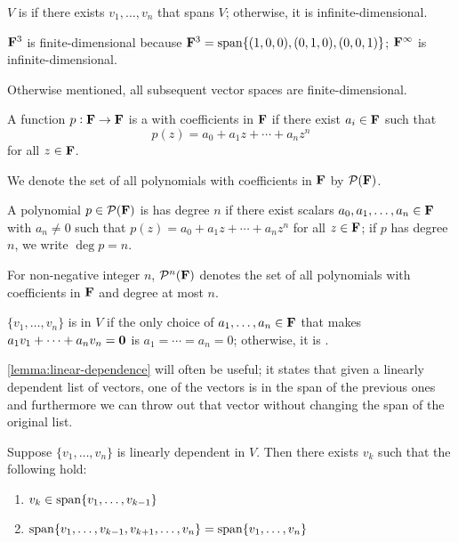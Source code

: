\begin{definition}
$V$ is  if there exists $v_1,\dots,v_n$ that spans $V$; otherwise, it is infinite-dimensional.
\end{definition}

\begin{example}
$\mathbf F^3$ is finite-dimensional because $\mathbf F^3=\operatorname{span}\{(1,0,0),(0,1,0),(0,0,1)\}$; $\mathbf F^\infty$ is infinite-dimensional.
\end{example}

Otherwise mentioned, all subsequent vector spaces are finite-dimensional. 

\begin{definition}[Polynomial]
A function $p:\mathbf F\to\mathbf F$ is a  with coefficients in $\mathbf F$ if there exist $a_i\in\mathbf F$ such that
\[p(z)=a_0+a_1z+\cdots+a_nz^n\]
for all $z\in\mathbf F$.

We denote the set of all polynomials with coefficients in $\mathbf F$ by $\mathcal{P}(\mathbf F)$.

A polynomial $p\in\mathcal{P}(\mathbf F)$ is has degree $n$ if there exist scalars $a_0,a_1,\dots,a_n\in\mathbf F$ with $a_n\neq0$ such that $p(z)=a_0+a_1z+\cdots+a_nz^n$ for all $z\in\mathbf F$; if $p$ has degree $n$, we write $\deg p=n$.

For non-negative integer $n$, $\mathcal{P}^n(\mathbf F)$ denotes the set of all polynomials with coefficients in $\mathbf F$ and degree at most $n$.
\end{definition}

\begin{definition}
$\{v_1,\dots,v_n\}$ is  in $V$ if the only choice of $a_1,\dots,a_n\in\mathbf F$ that makes $a_1v_1+\cdots+a_nv_n=\vb{0}$ is $a_1=\cdots=a_n=0$; otherwise, it is .
\end{definition}

\cref{lemma:linear-dependence} will often be useful; it states that given a linearly dependent list of vectors, one of the vectors is in the span of the previous ones and furthermore we can throw out that vector without changing the span of the original list.

\begin{lemma}\label{lemma:linear-dependence}
Suppose $\{v_1,\dots,v_n\}$ is linearly dependent in $V$. Then there exists $v_k$ such that the following hold:
\begin{enumerate}[label=(\roman*)]
\item $v_k\in\operatorname{span}\{v_1,\dots,v_{k-1}\}$
\item $\operatorname{span}\{v_1,\dots,v_{k-1},v_{k+1},\dots,v_n\}=\operatorname{span}\{v_1,\dots,v_n\}$
\end{enumerate}
\end{lemma}

